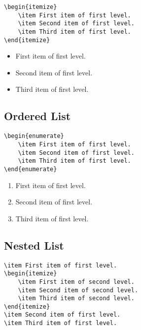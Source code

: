 \begin{lstlisting}[caption={An unordered list.}]
\begin{itemize}
    \item First item of first level.
    \item Second item of first level.
    \item Third item of first level.
\end{itemize}
\end{lstlisting}

\begin{itemize}
    \item First item of first level.
    \item Second item of first level.
    \item Third item of first level.
\end{itemize}

\subsection*{Ordered List}
\label{subsec:ordered-list}

\begin{lstlisting}[caption={An ordered list.}]
\begin{enumerate}
    \item First item of first level.
    \item Second item of first level.
    \item Third item of first level.
\end{enumerate}
\end{lstlisting}

\begin{enumerate}
    \item First item of first level.
    \item Second item of first level.
    \item Third item of first level.
\end{enumerate}

\subsection*{Nested List}
\label{subsec:nested-list}

\begin{lstlisting}[caption={A nested list.}]
\item First item of first level.
\begin{itemize}
    \item First item of second level.
    \item Second item of second level.
    \item Third item of second level.
\end{itemize}
\item Second item of first level.
\item Third item of first level.
\end{lstlisting}

